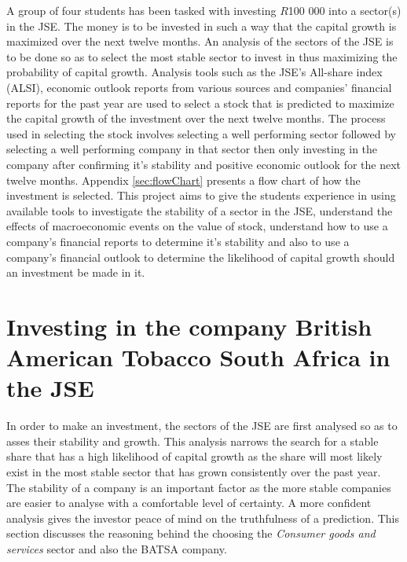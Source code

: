 \documentclass[letterpaper, 10 pt, conference]{ieeeconf}  %
\begin{document}
A group of four students has been tasked with investing $R$100 000 into a sector(s) in the JSE. The money is to be invested in such a way that the capital growth is maximized over the next twelve months. An analysis of the sectors of the JSE is to be done so as to select the most stable sector to invest in thus maximizing the probability of capital growth. Analysis tools such as the JSE's All-share index (ALSI), economic outlook reports from various sources and companies' financial reports for the past year are used to select a stock that is predicted to maximize the capital growth of the investment over the next twelve months. The process used in selecting the stock involves selecting a well performing sector followed by selecting a well performing company in that sector then only investing in the company after confirming it's stability and positive economic outlook for the next twelve months. Appendix \ref{sec:flowChart} presents a flow chart of how the investment is selected. This project aims to give the students experience in using available tools to investigate the stability of a sector in the JSE, understand the effects of macroeconomic events on the value of stock, understand how to use a company's financial reports to determine it's stability and also to use a company's financial outlook to determine the likelihood of capital growth should an investment be made in it. 

\section{Investing in the company British American Tobacco  South Africa in the JSE}

In order to make an investment, the sectors of the JSE are first analysed so as to asses their stability and growth. This analysis narrows the search for a stable share that has a high likelihood of capital growth as the share will most likely exist in the most stable sector that has grown consistently over the past year. The stability of a company is an important factor as the more stable companies are easier to analyse with a comfortable level of certainty. A more confident analysis gives the investor peace of mind on the truthfulness of a prediction. This section discusses the reasoning behind the choosing the \textit{Consumer goods and services} sector and also the BATSA company.
\end{document}
